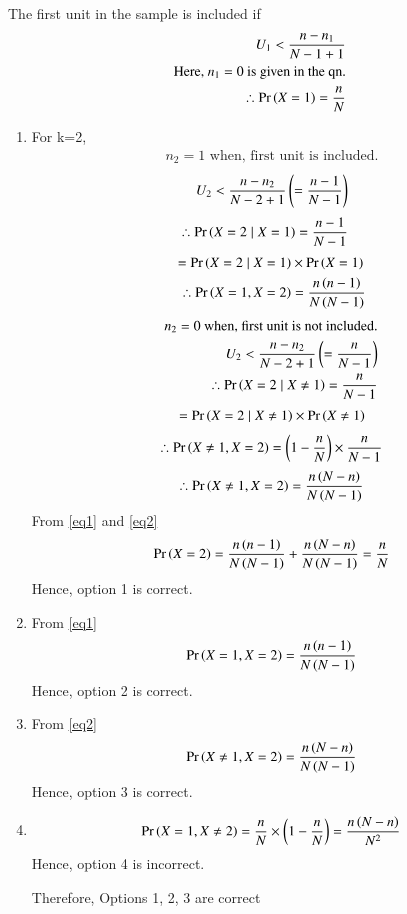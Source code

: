 \documentclass[journal,12pt,twocolumn]{IEEEtran}
\begin{document}
The first unit in the sample is included if
\begin{align}
    U_1 < \frac{n-n_1}{N-1+1}  
    \\\text{Here, } n_1=0 \text{ is given in the qn.}
    \\\therefore \Pr\left(X=1\right) = \frac{n}{N}
\end{align}
\begin{enumerate}
    \item For k=2, 
\begin{align}
    n_2 = 1 \text{ when, first unit is included.}
\end{align}
\begin{align}
    U_2 < \frac{n-n_2}{N-2+1} \left( = \frac{n-1}{N-1}\right)
\end{align}
\begin{align}
    \therefore \Pr\left(X=2 \mid X=1\right) &= \frac{n-1}{N-1}
\end{align}
\begin{align}
     = \Pr\left(X=2 \mid X=1\right) &\times \Pr\left(X=1\right)
    \\\therefore \Pr\left(X=1, X=2\right) &= \frac{n \left(n-1\right)}{N \left(N-1\right)} \label{eq1}
\end{align}
\begin{align}
    n_2 = 0 \text{ when, first unit is not included.}
    \\U_2 < \frac{n-n_2}{N-2+1} \left(= \frac{n}{N-1}\right)
    \\\therefore \Pr\left(X=2 \mid X\neq 1\right) = \frac{n}{N-1}
\end{align}
\begin{align}
     = \Pr\left(X=2 \mid X\neq1\right) \times \Pr\left(X\neq1\right)
\end{align}
\begin{align}
    \therefore \Pr\left(X\neq1,X=2\right) = \left(1-\frac{n}{N}\right)\times\frac{n}{N-1}
\end{align}
\begin{align}
    \therefore \Pr\left(X\neq1,X=2\right) = \frac{n \left(N-n\right)}{N \left(N-1\right)} \label{eq2}
\end{align}
From \eqref{eq1} and \eqref{eq2}
\begin{align}
    \Pr\left(X=2\right) = \frac{n \left(n-1\right)}{N \left(N-1\right)} + \frac{n \left(N-n\right)}{N \left(N-1\right)} = \frac{n}{N}
\end{align}
Hence, option 1 is correct.
\item From \eqref{eq1}
\begin{align}
    \Pr\left(X=1, X=2\right) = \frac{n \left(n-1\right)}{N \left(N-1\right)}
\end{align}
Hence, option 2 is correct.
\item From \eqref{eq2}
\begin{align}
    \Pr\left(X\neq1,X=2\right) = \frac{n \left(N-n\right)}{N \left(N-1\right)}
\end{align}
Hence, option 3 is correct.
\item 
\begin{align}
\Pr\left(X=1, X\neq2\right) = \frac{n}{N} \times \left(1-\frac{n}{N}\right) = \frac{n \left(N-n\right)}{N^2}
\end{align}
Hence, option 4 is incorrect.

Therefore, Options 1, 2, 3 are correct
\end{enumerate}
\end{document}
